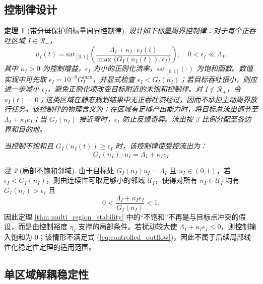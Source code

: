 \documentclass[a4paper,12pt]{article}
\theoremstyle{plain}
\newtheorem{theorem}{定理}[section]
\theoremstyle{definition}
\theoremstyle{remark}
\newtheorem{remark}[theorem]{注}
\begin{document}
\subsection{控制律设计}

\begin{theorem}[带分母保护的标量周界控制律]\label{thm:control_law}
设计如下标量周界控制律：对于每个正吞吐区域 $I \in \mathcal{R}_+$，
\begin{equation}\label{eq:control_law}
    u_I(t) = \text{sat}_{[0,1]}\left( \frac{\Lambda_I + \kappa_I \cdot e_I(t)}{\max\{G_I(n_I(t)),\epsilon_I\}} \right),
    \quad 0<\epsilon_I\ll \Lambda_I .
\end{equation}
其中 $\kappa_I > 0$ 为控制增益，$\epsilon_I$ 为小的正则化流率，$\text{sat}_{[0,1]}(\cdot)$ 为饱和函数。数值实现中可先取 $\epsilon_I=10^{-6}G_I^{\max}$，并显式检查 $\epsilon_I<G_I(\bar n_I)$；若目标吞吐很小，则应进一步减小 $\epsilon_I$，避免正则化项改变目标附近的未饱和控制律。对 $I\notin\mathcal R_+$，令 $u_I(t)=0$；这类区域在静态规划结果中无正吞吐流经过，因而不承担主动周界放行任务。该控制律的物理含义为：在区域有足够产出能力时，将目标总流出调节至 $\Lambda_I+\kappa_I e_I$；当 $G_I(n_I)$ 接近零时，$\epsilon_I$ 防止反馈奇异。流出按 $\beta$ 比例分配至各边界和目的地。

当控制不饱和且 $G_I(n_I(t))\ge \epsilon_I$ 时，该控制律使受控流出为：
\begin{equation}\label{eq:controlled_outflow}
    G_I(n_I) \cdot u_I = \Lambda_I + \kappa_I e_I
\end{equation}
\end{theorem}

\begin{remark}[局部不饱和邻域]\label{rem:unsaturated_neighborhood}
由于目标处 $G_I(\bar n_I)\bar u_I=\Lambda_I$ 且 $\bar u_I\in(0,1)$，若 $\epsilon_I<G_I(\bar n_I)$，则由连续性可取足够小的邻域 $\mathcal U_I$，使得对所有 $n_I\in\mathcal U_I$ 均有 $G_I(n_I)>\epsilon_I$ 且
\begin{equation}
    0<\frac{\Lambda_I+\kappa_I e_I}{G_I(n_I)}<1 .
\end{equation}
因此定理 \ref{thm:multi_region_stability} 中的“不饱和”不再是与目标点冲突的假设，而是由控制裕度 $\eta_I$ 支撑的局部条件。若扰动较大使 $\Lambda_I+\kappa_I e_I\le0$，则控制输入饱和为 $0$；该情形不满足式 (\ref{eq:controlled_outflow})，因此不属于后续局部线性化稳定性定理的适用范围。
\end{remark}

\subsection{单区域解耦稳定性}
\end{document}
